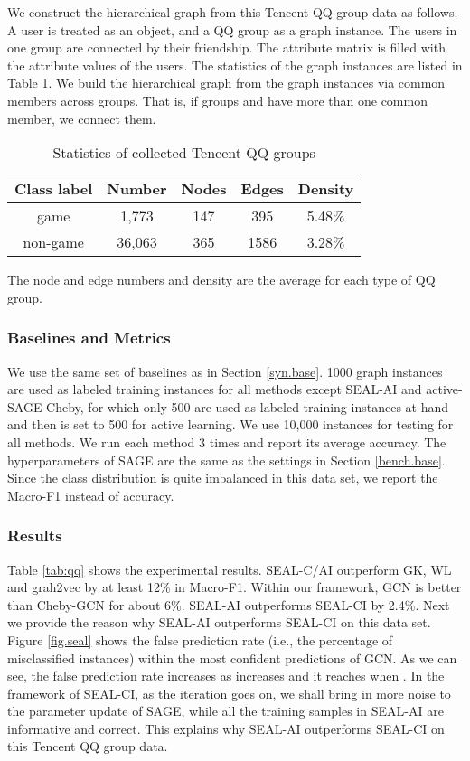 \documentclass[sigconf]{acmart}
\newcommand{\eat}[1]{}
\begin{document}
We construct the hierarchical graph from this Tencent QQ group data as follows.  A user is treated as an object, and a QQ group as a graph instance.  The users in one group are connected by their friendship.  The attribute matrix  is filled with the attribute values of the users.  The statistics of the graph instances are listed in Table \ref{tab:sqq}.  We build the hierarchical graph from the graph instances via common members across groups.  That is, if groups  and  have more than one common member, we connect them.

\begin{table}
  \caption{Statistics of collected Tencent QQ groups}
  \label{tab:sqq}
  \begin{tabular}{ccccc}
    \toprule
    \textbf{Class label}&\textbf{Number}&\textbf{Nodes}&\textbf{Edges}&\textbf{Density} \\
    \midrule
	game&1,773&147&395&5.48\%\\
	non-game&36,063&365&1586&3.28\%\\
  \bottomrule
\end{tabular}

\raggedright{The node and edge numbers and density are the average for each type of QQ group.}
\eat{\vspace{-0.3cm}}
\end{table}


\subsubsection{Baselines and Metrics}
We use the same set of baselines as in Section \ref{syn.base}.  1000 graph instances are used as labeled training instances for all methods except SEAL-AI and active-SAGE-Cheby, for which only 500 are used as labeled training instances at hand and then  is set to 500 for active learning.  We use 10,000 instances for testing for all methods.  We run each method 3 times and report its average accuracy.  The hyperparameters of SAGE are the same as the settings in Section \ref{bench.base}. Since the class distribution is quite imbalanced in this data set, we report the Macro-F1 instead of accuracy.

\subsubsection{Results}

Table \ref{tab:qq} shows the experimental results.  SEAL-C/AI outperform GK, WL and grah2vec by at least 12\% in Macro-F1.  Within our framework, GCN is better than Cheby-GCN for about 6\%.  SEAL-AI outperforms SEAL-CI by 2.4\%.  Next we provide the reason why SEAL-AI outperforms SEAL-CI on this data set.  Figure \ref{fig.seal} shows the false prediction rate (i.e., the percentage of misclassified instances) within the  most confident predictions of GCN.  As we can see, the false prediction rate increases as  increases and it reaches  when . In the framework of SEAL-CI, as the iteration goes on, we shall bring in more noise to the parameter update of SAGE, while all the training samples in SEAL-AI are informative and correct. This explains why SEAL-AI outperforms SEAL-CI on this Tencent QQ group data.
\end{document}
